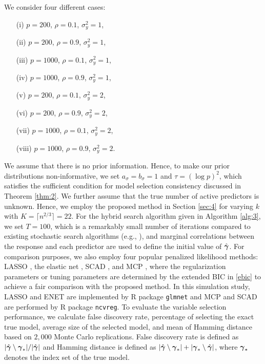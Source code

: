 We consider four different cases: 
\begin{itemize}
	\item [(i)] $p=200$, $\rho=0.1$, $\sigma^2_y = 1$,
	\item [(ii)] $p=200$, $\rho=0.9$, $\sigma^2_y = 1$,
	\item [(iii)] $p=1000$, $\rho=0.1$, $\sigma^2_y = 1$,
	\item [(iv)] $p=1000$, $\rho=0.9$, $\sigma^2_y = 1$,
	\item [(v)] $p=200$, $\rho=0.1$, $\sigma^2_y = 2$,
	\item [(vi)] $p=200$, $\rho=0.9$, $\sigma^2_y = 2$,
	\item [(vii)] $p=1000$, $\rho=0.1$, $\sigma^2_y = 2$,
	\item [(viii)] $p=1000$, $\rho=0.9$, $\sigma^2_y = 2$.
\end{itemize}
We assume that there is no prior information. Hence, to make our prior distributions non-informative, we set $a_\sigma=b_\sigma=1$ and $\tau=(\log p)^2$, which satisfies the sufficient condition for model selection consistency discussed in Theorem \ref{thm:2}. We further assume that the true number of active predictors is unknown. Hence, we employ the proposed method in Section \ref{sec:4} for varying $k$ with $K=\lceil n^{2/3} \rceil =22$. For the hybrid search algorithm given in Algorithm \ref{alg:3}, we set $T=100$, which is a remarkably small number of iterations compared to existing stochastic search algorithms (e.g., \citealt{kirkpatrick1983optimization, george1993variable, hans2007shotgun}), and marginal correlations between the response and each predictor are used to define the initial value of $\hat{{\boldsymbol \gamma}}$. For comparison purposes, we also employ four popular penalized likelihood methods: LASSO \citep{tibshirani1996regression}, the elastic net \citep{zou2005regularization}, SCAD \citep{fan2001variable}, and MCP \citep{zhang2010nearly}, where the regularization parameters or tuning parameters are determined by the extended BIC in \eqref{ebic} to achieve a fair comparison with the proposed method. In this simulation study, LASSO and ENET are implemented by R package \texttt{glmnet} and  MCP and SCAD are performed by R package \texttt{ncvreg}. To evaluate the variable selection performance, we calculate false discovery rate, percentage of selecting the exact true model, average size of the selected model, and mean of Hamming distance based on $2,000$ Monte Carlo replications. False discovery rate is defined as $|\hat{{\boldsymbol \gamma}}\setminus {\boldsymbol \gamma}_*|/|\hat{{\boldsymbol \gamma}}|$ and Hamming distance is defined as $|\hat{{\boldsymbol \gamma}}\setminus {\boldsymbol \gamma}_* |+|{\boldsymbol \gamma}_* \setminus  \hat{{\boldsymbol \gamma}}|$, where ${\boldsymbol \gamma}_*$ denotes the index set of the true model.

